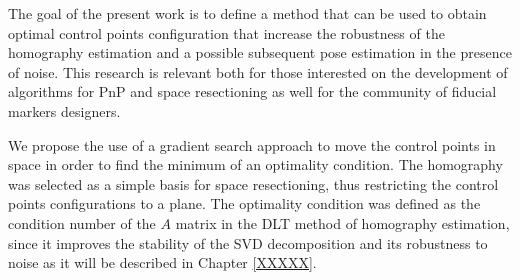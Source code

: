\documentclass[letterpaper, 10 pt, conference]{ieeeconf}  %
\begin{document}
The goal of the present work is to define a method that can be used to obtain optimal control points configuration that increase the robustness of the homography estimation and a possible subsequent pose estimation in the presence of noise. This research is relevant both for those interested on the development of algorithms for PnP and space resectioning as well for the community of fiducial markers designers.

We propose the use of a gradient search approach to move the control points in space in order to find the minimum of an optimality condition. The homography was selected as a simple basis for space resectioning, thus restricting the control points configurations to a plane. The optimality condition was defined as the condition number of the $A$ matrix in the DLT method of homography estimation, since it improves the stability of the SVD decomposition and its robustness to noise as it will be described in Chapter \ref{XXXXX}.









\end{document}
